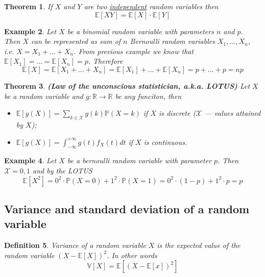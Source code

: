 \documentclass[12pt]{article}
\newtheorem{theorem}{Theorem}[subsection]
\newtheorem{definition}[theorem]{Definition}
\newtheorem{example}[theorem]{Example}
\begin{document}
\begin{theorem} If $X$ and $Y$ are two \underline{independent} random variables
    then
    $$
        \mathbb{E}[XY]=\mathbb{E}[X]\cdot\mathbb{E}[Y]
    $$
\end{theorem}

\begin{example} Let $X$ be a binomial random variable with parameters $n$ and
    $p$. Then $X$ can be represented as sum of $n$ Bernoulli random variables
    $X_1,\ldots,X_n$, i.e. $X=X_1+\ldots+X_n$.     %
    From previous example we know
    that $\mathbb{E}[X_1]=\ldots=\mathbb{E}[X_n]=p$. Therefore    %
    $$
        \mathbb{E}[X]
        =\mathbb{E}[X_1+\ldots+X_n]     %
        =\mathbb{E}[X_1]+\ldots+\mathbb{E}[X_n]    %
        =p+\ldots+p=np    %
    $$
\end{example}

\begin{theorem} \textbf{(Law of the unconscious statistician, a.k.a. LOTUS)} Let
    $X$ be a random variable and $g:\mathbb{R}\to\mathbb{R}$ be any funciton,
    then
    \begin{itemize}
        \item $\mathbb{E}[g(X)]=\sum_{k\in\mathcal{X}}g(k)\mathbb{P}(X=k)$ if
              $X$ is discrete ($\mathcal{X}$ --- values attained by $X$);
        \item $\mathbb{E}[g(X)]=\int_{-\infty}^{+\infty} g(t)f_X(t)dt$ if $X$ is
              continuous.
    \end{itemize}
\end{theorem}

\begin{example} Let $X$ be a bernoulli random variable with parameter $p$. Then
    $\mathcal{X}={0,1}$ and by the LOTUS
    $$
        \mathbb{E}[X^2]=
        0^2\cdot\mathbb{P}(X=0)+1^2\cdot\mathbb{P}(X=1)
        =0^2\cdot (1-p)+1^2\cdot p=p
    $$
\end{example}


\subsection{Variance and standard deviation of a random variable}

\begin{definition} Variance of a random variable $X$ is the expected value of
    the random variable ${(X-\mathbb{E}[X])}^2$. In other words
    $$
        \mathbb{V}[X]=\mathbb{E}[{(X-\mathbb{E}[x])}^2]
    $$
\end{definition}
\end{document}
